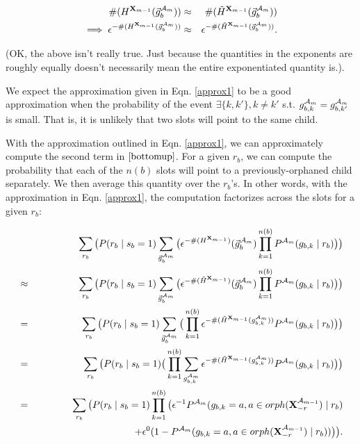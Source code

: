 \documentclass[11pt]{article}
\newcommand{\A}{{\cal A}}
\newcommand{\X}{\mathbf{X}}
\newcommand{\XrmPrev}{\X^{\A_{m-1}}_{-r}}
\newcommand{\Am}{\A_{m}}
\begin{document}
\begin{eqnarray}
\#(H^{\X_{m-1}}(\vec{g}^{\Am}_b)) &\approx& \#(\tilde{H}^{\X_{m-1}} (\vec{g}^{\Am}_b)) \\
\implies \epsilon^{-\#(H^{\X_{m-1}}(\vec{g}^{\Am}_b))} &\approx& \epsilon^{-\#(\tilde{H}^{\X_{m-1}}(\vec{g}^{\Am}_b))} \label{approx1}.
\end{eqnarray}

(OK, the above isn't really true. Just because the quantities in the exponents are roughly equally doesn't necessarily mean the entire exponentiated quantity is.).
 
We expect the approximation given in Eqn. \ref{approx1} to be a good approximation when the probability of the event $\exists \{k,k'\}, k \neq k'$ s.t. $g^{\Am}_{b,k}=g^{\Am}_{b,k'}$ is small. That is, it is unlikely that two slots will point to the same child.


With the approximation outlined in Eqn. \ref{approx1}, we can approximately compute the second term in $\ref{bottomup}$. For a given $r_b$, we can compute the probability that each of the $n(b)$ slots will point to a previously-orphaned child separately. We then average this quantity over the $r_b$'s. In other words, with the approximation in Eqn. \ref{approx1}, the computation factorizes across the slots for a given $r_b$:

\begin{eqnarray}
& & \sum_{r_b} \big(P(r_b \mid s_b = 1) \sum_{\vec{g}^{\Am}_{b}} \big( \epsilon^{-\#(H^{\X_{m-1}})}(\vec{g}^{\Am}_b) \prod_{k=1}^{n(b)} P^{\Am}(g_{b,k} \mid r_b) \big) \big) \\
%
&\approx& \sum_{r_b} \big(P(r_b \mid s_b = 1) \sum_{\vec{g}^{\Am}_{b}} \big( \epsilon^{-\#(\tilde{H}^{\X_{m-1}})}(\vec{g}^{\Am}_b) \prod_{k=1}^{n(b)} P^{\Am}(g_{b,k} \mid r_b) \big) \big) \label{eqn.bottomupTilde}  \\
%
&=& \sum_{r_b} \big( P(r_b \mid s_b = 1) \sum_{\vec{g}^{\Am}_{b}} \big( \prod_{k=1}^{n(b)} \epsilon^{-\#(\tilde{H}^{\X_{m-1}}(g^{\Am}_{b,k}))}P^{\Am}(g_{b,k} \mid r_b) \big) \big) \\
%
&=& \sum_{r_b} \big( P(r_b \mid s_b = 1)\big( \prod_{k=1}^{n(b)}  \sum_{g^{\Am}_{b,k}} \epsilon^{-\#(\tilde{H}^{\X_{m-1}}(g^{\Am}_{b,k}))}P^{\Am}(g_{b,k} \mid r_b) \big) \big) \\
%
&=& \sum_{r_b} \big( P(r_b \mid s_b = 1) \prod_{k=1}^{n(b)} \big ( \epsilon^{-1}P^{\Am}(g_{b,k} = a, a \in orph(\XrmPrev) \mid r_b) \\ 
& & \qquad \qquad \qquad \qquad \qquad + \epsilon^{0}(1-P^{\Am}(g_{b,k} = a, a \in orph(\XrmPrev) \mid r_b)) \big) \big). \label{eqn.approxBottomUpFinal}
\end{eqnarray}
\end{document}
